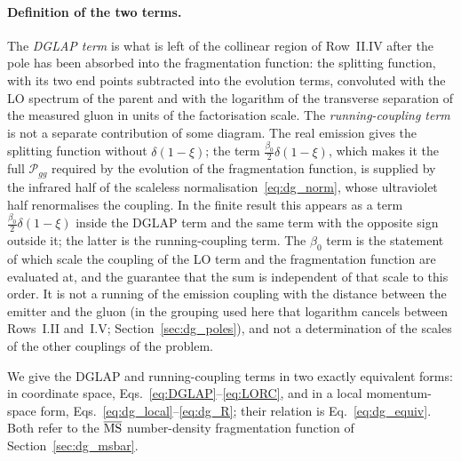 \paragraph{Definition of the two terms.} The \emph{DGLAP term} is what is left of the collinear region of Row~II.IV after the pole has been absorbed into the fragmentation function: the splitting function, with its two end points subtracted into the evolution terms, convoluted with the LO spectrum of the parent and with the logarithm of the transverse separation of the measured gluon in units of the factorisation scale. The \emph{running-coupling term} is not a separate contribution of some diagram. The real emission gives the splitting function without $\delta(1-\xi)$; the term $\frac{\beta_0}{2}\delta(1-\xi)$, which makes it the full $\mathcal P_{gg}$ required by the evolution of the fragmentation function, is supplied by the infrared half of the scaleless normalisation~\eqref{eq:dg_norm}, whose ultraviolet half renormalises the coupling. In the finite result this appears as a term $\frac{\beta_0}{2}\delta(1-\xi)$ inside the DGLAP term and the same term with the opposite sign outside it; the latter is the running-coupling term. The $\beta_0$ term is the statement of which scale the coupling of the LO term and the fragmentation function are evaluated at, and the guarantee that the sum is independent of that scale to this order. It is not a running of the emission coupling with the distance between the emitter and the gluon (in the grouping used here that logarithm cancels between Rows~I.II and~I.V; Section~\ref{sec:dg_poles}), and not a determination of the scales of the other couplings of the problem.

We give the DGLAP and running-coupling terms in two exactly equivalent forms: in coordinate space, Eqs.~\eqref{eq:DGLAP}--\eqref{eq:LORC}, and in a local momentum-space form, Eqs.~\eqref{eq:dg_local}--\eqref{eq:dg_R}; their relation is Eq.~\eqref{eq:dg_equiv}. Both refer to the $\overline{\rm MS}$ number-density fragmentation function of Section~\ref{sec:dg_msbar}.

